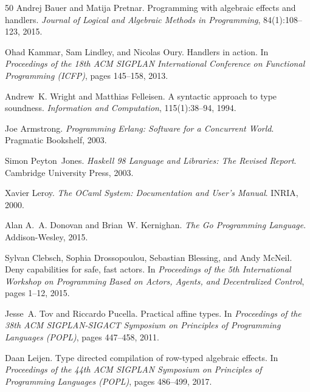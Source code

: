 \documentclass[11pt]{article}
\begin{document}
\begin{thebibliography}{50}
Andrej Bauer and Matija Pretnar.
\newblock Programming with algebraic effects and handlers.
\newblock \emph{Journal of Logical and Algebraic Methods in Programming}, 84(1):108--123, 2015.

Ohad Kammar, Sam Lindley, and Nicolas Oury.
\newblock Handlers in action.
\newblock In \emph{Proceedings of the 18th ACM SIGPLAN International Conference on Functional Programming (ICFP)}, pages 145--158, 2013.

Andrew~K. Wright and Matthias Felleisen.
\newblock A syntactic approach to type soundness.
\newblock \emph{Information and Computation}, 115(1):38--94, 1994.

Joe Armstrong.
\newblock \emph{Programming Erlang: Software for a Concurrent World}.
\newblock Pragmatic Bookshelf, 2003.

Simon Peyton~Jones.
\newblock \emph{Haskell 98 Language and Libraries: The Revised Report}.
\newblock Cambridge University Press, 2003.

Xavier Leroy.
\newblock \emph{The {OCaml} System: Documentation and User's Manual}.
\newblock INRIA, 2000.

Alan A.~A. Donovan and Brian~W. Kernighan.
\newblock \emph{The Go Programming Language}.
\newblock Addison-Wesley, 2015.

Sylvan Clebsch, Sophia Drossopoulou, Sebastian Blessing, and Andy McNeil.
\newblock Deny capabilities for safe, fast actors.
\newblock In \emph{Proceedings of the 5th International Workshop on Programming Based on Actors, Agents, and Decentralized Control}, pages 1--12, 2015.

Jesse~A. Tov and Riccardo Pucella.
\newblock Practical affine types.
\newblock In \emph{Proceedings of the 38th ACM SIGPLAN-SIGACT Symposium on Principles of Programming Languages (POPL)}, pages 447--458, 2011.

Daan Leijen.
\newblock Type directed compilation of row-typed algebraic effects.
\newblock In \emph{Proceedings of the 44th ACM SIGPLAN Symposium on Principles of Programming Languages (POPL)}, pages 486--499, 2017.


\end{thebibliography}
\end{document}
